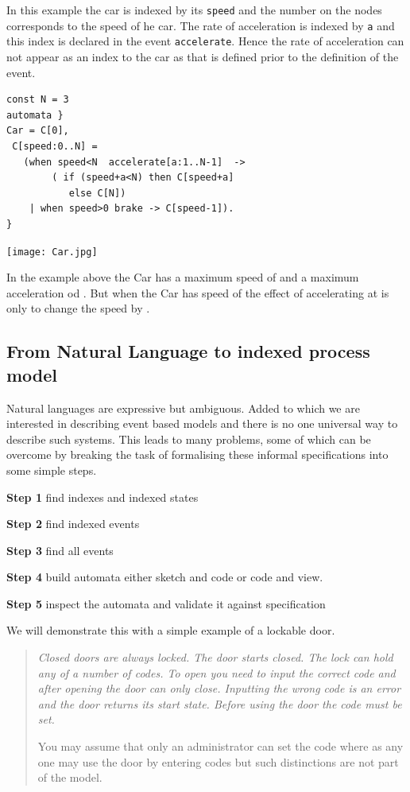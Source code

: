 \documentclass[]{article}
\begin{document}
In this example the car is indexed by its \verb|speed| and  the number on the nodes corresponds to the speed of he car. The rate of acceleration is indexed by \verb|a| and this index  is declared in the event \verb|accelerate|. Hence the rate of acceleration can not appear as an index to the car as that is defined prior to the definition of the event.


\begin{minipage}{0.52\textwidth}
\begin{verbatim}
const N = 3
automata }
Car = C[0],
 C[speed:0..N] =
   (when speed<N  accelerate[a:1..N-1]  ->
        ( if (speed+a<N) then C[speed+a]
           else C[N])
    | when speed>0 brake -> C[speed-1]).
}\end{verbatim}
\end{minipage}
\begin{minipage}{0.35\textwidth}
 \texttt{[image: Car.jpg]}
 \end{minipage}

In the example above the {\sf Car} has a maximum speed of {} and a maximum acceleration od {}. But when the {\sf Car} has speed of {} the effect of accelerating at {} is only to change the speed by {}.

 \subsection{From Natural Language to indexed process model}
 Natural languages are expressive but ambiguous.  Added to which we are interested in describing event based models and there is no one universal way to describe such systems. This leads to many problems, some of which can be overcome by breaking the task of formalising these informal specifications into some simple steps.



 {\bf Step 1} find indexes and  indexed states

 {\bf Step 2} find indexed events

 {\bf Step 3} find all events

 {\bf Step 4} build automata
either sketch and code or code and view.

 {\bf Step 5} inspect the automata and validate it against specification

\noindent We will demonstrate this with a simple example of a lockable door.

\begin{quote}
{\it Closed doors are always locked. The door starts closed. The lock can hold any of  a number of  codes.  To open you need to input the correct code and after opening the door can only close. Inputting the wrong code is an error and the door returns its start state. Before using the door the code must be set.

You may assume that only an administrator can set the code  where as any one may use the door by entering codes but such distinctions are not part of the model.
}
\end{quote}
\end{document}
